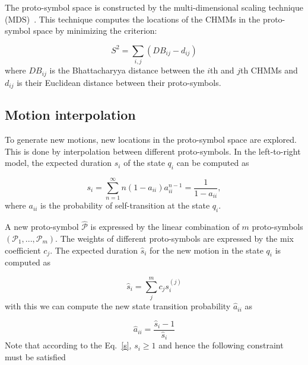 The proto-symbol space is constructed by the multi-dimensional scaling technique (MDS)~\citep{schiffman1981introduction}. This technique computes the locations of the CHMMs in the proto-symbol space by minimizing the criterion:

\begin{equation}
S^2 = \sum_{i,j}\left(DB_{ij}-d_{ij}\right)
\end{equation}
where $DB_{ij}$ is the Bhattacharyya distance between the $i$th and $j$th CHMMs and $d_{ij}$ is their Euclidean distance between their proto-symbols. %



\subsection{Motion interpolation}
\label{cha5:sec2:interpolation}
To generate new motions, new locations in the proto-symbol space are explored. This is done by interpolation between different proto-symbols.
In the left-to-right model, the expected duration $s_i$ of the state $q_i$ can be computed as

\begin{equation}
\label{sequation}
s_i = \sum_{n=1}^{\infty} n(1-a_{ii})a_{ii}^{n-1} = \frac{1}{1-a_{ii}},
\end{equation}
where $a_{ii}$ is the probability of self-transition at the state $q_i$.

A new proto-symbol $\hat{\mathcal{P}}$ is expressed by the linear combination of $m$ proto-symbols $(\mathcal{P}_1, ..., \mathcal{P}_m)$. The weights of different proto-symbols are expressed by the mix coefficient $c_j$. The expected duration $\hat{s}_i$ for the new motion in the state $q_i$ is computed as

\begin{equation}
\hat{s}_i = \sum_j^mc_js_i^{(j)}
\label{s}
\end{equation}
with this we can compute the new state transition probability $\hat{a}_{ii}$ as

\begin{equation}
\hat{a}_{ii} = \frac{\hat{s}_i-1}{\hat{s}_i}
\end{equation}
Note that according to the Eq.~\ref{s}, $s_i\ge1$ and hence the following constraint must be satisfied

